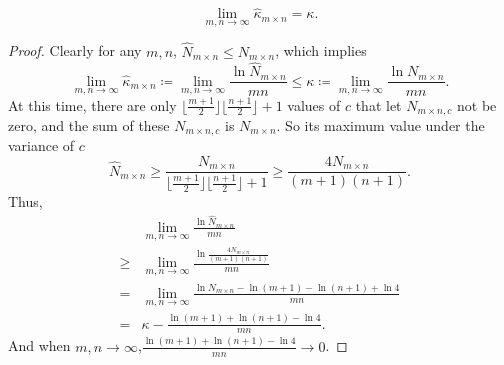 \documentclass[10pt,a4paper]{amsart}
\begin{document}
    \begin{proposition}
        \[
            \lim_{m,n\rightarrow\infty}\hat{\kappa}_{m\times n}=\kappa.
        \]
    \end{proposition}

    \begin{proof}
        Clearly for any $m,n$, $\hat{N}_{m\times n}\leq N_{m\times n}$, which implies
        \[
            \lim_{m,n\rightarrow\infty}\hat{\kappa}_{m\times n} \coloneq\lim_{m,n\rightarrow\infty}\frac{\ln \hat{N}_{m\times n}}{mn} \leq\kappa \coloneq \lim_{m,n\rightarrow\infty}\frac{\ln N_{m\times n}}{mn}.
        \]
        At this time, there are only $\lfloor\frac{m+1}{2}\rfloor\lfloor\frac{n+1}{2}\rfloor+1$ values of $c$ that let $N_{m\times n,c}$ not be zero,
        and the sum of these $N_{m\times n,c}$ is $N_{m\times n}$.
        So its maximum value under the variance of $c$
        \[
            \hat{N}_{m\times n}\geq \frac{N_{m\times n}}{\lfloor\frac{m+1}{2}\rfloor\lfloor\frac{n+1}{2}\rfloor+1} \geq \frac{4N_{m\times n}}{(m+1)(n+1)}.
        \]
        Thus,
        \begin{align*}
            & \lim_{m,n\rightarrow\infty}\frac{\ln \hat{N}_{m\times n}}{mn}\\
            \geq & \lim_{m,n\rightarrow\infty}\frac{\ln \frac{4N_{m\times n}}{(m+1)(n+1)}}{mn}\\
            = & \lim_{m,n\rightarrow\infty}\frac{\ln N_{m\times n}-\ln (m+1) -\ln (n+1) +\ln 4}{mn}\\
            =& \kappa -\frac{\ln (m+1) +\ln (n+1) -\ln 4}{mn}.
        \end{align*}
        And when $m,n\rightarrow\infty$,$\frac{\ln (m+1) +\ln (n+1) -\ln 4}{mn}\rightarrow0$.
    \end{proof}
\end{document}
